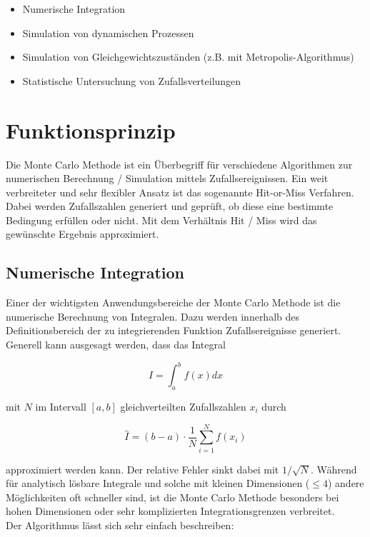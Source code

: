 \documentclass{book}
\begin{document}
\begin{refsection}
\begin{itemize}
	\item Numerische Integration
	\item Simulation von dynamischen Prozessen
	\item Simulation von Gleichgewichtszuständen (z.B. mit Metropolis-Algorithmus)
	\item Statistische Untersuchung von Zufallsverteilungen
\end{itemize}

\section{Funktionsprinzip}
Die Monte Carlo Methode ist ein Überbegriff für verschiedene Algorithmen zur numerischen Berechnung / Simulation mittels Zufallsereignissen. Ein weit verbreiteter und sehr flexibler Ansatz ist das sogenannte Hit-or-Miss Verfahren. Dabei werden Zufallszahlen generiert und geprüft, ob diese eine bestimmte Bedingung erfüllen oder nicht. Mit dem Verhältnis Hit / Miss wird das gewünschte Ergebnis approximiert. 

\subsection{Numerische Integration} \label{subsec:numIntegration}
Einer der wichtigsten Anwendungsbereiche der Monte Carlo Methode ist die numerische Berechnung von Integralen. Dazu werden innerhalb des Definitionsbereich der zu integrierenden Funktion Zufallsereignisse generiert. Generell kann ausgesagt werden, dass das Integral

\begin{equation}
	I = \int_a^b f(x) dx
\end{equation} 

mit $N$ im Intervall $[a,b]$ gleichverteilten Zufallszahlen $x_i$ durch

\begin{equation}
	\hat{I} = (b-a) \cdot \frac{1}{N} \sum_{i=1}^{N} f(x_i)
\end{equation}

approximiert werden kann. Der relative Fehler sinkt dabei mit $1 / \sqrt{N}$. Während für analytisch lösbare Integrale und solche mit kleinen Dimensionen ($\leq 4$) andere Möglichkeiten oft schneller sind, ist die Monte Carlo Methode besonders bei hohen Dimensionen oder sehr komplizierten Integrationsgrenzen verbreitet. \\

Der Algorithmus lässt sich sehr einfach beschreiben:


\end{refsection}
\end{document}
